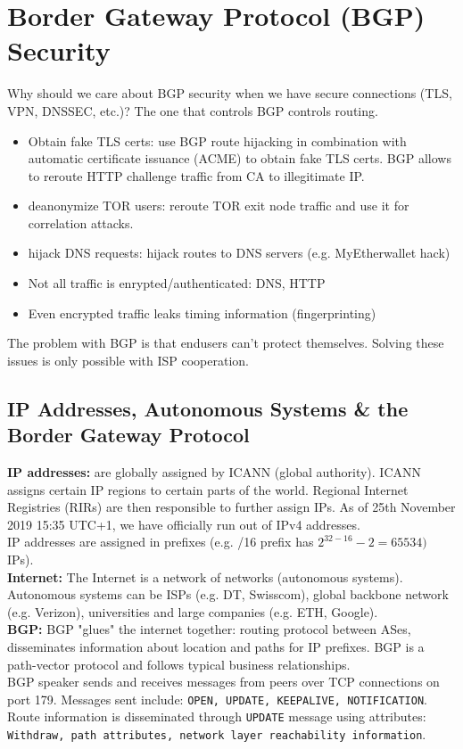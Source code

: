 \section{Border Gateway Protocol (BGP) Security}

Why should we care about BGP security when we have secure connections (TLS, VPN, DNSSEC, etc.)? The one that controls BGP controls routing.

\begin{itemize}
	\item Obtain fake TLS certs: use BGP route hijacking in combination with automatic certificate issuance (ACME) to obtain fake TLS certs. BGP allows to reroute HTTP challenge traffic from CA to illegitimate IP.
	\item deanonymize TOR users: reroute TOR exit node traffic and use it for correlation attacks.
	\item hijack DNS requests: hijack routes to DNS servers (e.g. MyEtherwallet hack)
	\item Not all traffic is enrypted/authenticated: DNS, HTTP
	\item Even encrypted traffic leaks timing information (fingerprinting)
\end{itemize}

The problem with BGP is that endusers can't protect themselves. Solving these issues is only possible with ISP cooperation.

\subsection{IP Addresses, Autonomous Systems \& the Border Gateway Protocol}

\textbf{IP addresses:} are globally assigned by ICANN (global authority). ICANN assigns certain IP regions to certain parts of the world. Regional Internet Registries (RIRs) are then responsible to further assign IPs. As of 25th November 2019 15:35 UTC+1, we have officially run out of IPv4 addresses.\\
IP addresses are assigned in prefixes (e.g. /16 prefix has $2^{32-16} - 2= 65534)$ IPs).\\

\textbf{Internet:} The Internet is a network of networks (autonomous systems). Autonomous systems can be ISPs (e.g. DT, Swisscom), global backbone network (e.g. Verizon), universities and large companies (e.g. ETH, Google).\\

\textbf{BGP:} BGP "glues" the internet together: routing protocol between ASes, disseminates information about location and paths for IP prefixes. BGP is a path-vector protocol and follows typical business relationships.\\
BGP speaker sends and receives messages from peers over TCP connections on port 179. Messages sent include: \texttt{OPEN, UPDATE, KEEPALIVE, NOTIFICATION}. Route information is disseminated through \texttt{UPDATE} message using attributes: \texttt{Withdraw, path attributes, network layer reachability information}.\\
\\
